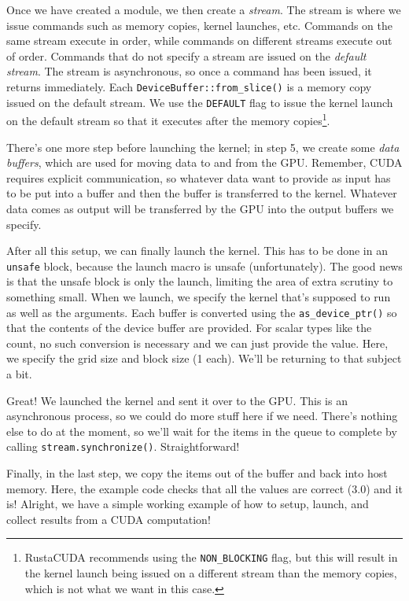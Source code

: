 Once we have created a module, we then create a \textit{stream}. The stream is where we issue commands such as memory copies, kernel launches, etc. Commands on the same stream execute in order, while commands on different streams execute out of order. Commands that do not specify a stream are issued on the \textit{default stream}. The stream is asynchronous, so once a command has been issued, it returns immediately. Each \texttt{DeviceBuffer::from\_slice()} is a memory copy issued on the default stream. We use the \texttt{DEFAULT} flag to issue the kernel launch on the default stream so that it executes after the memory copies\footnote{RustaCUDA recommends using the \texttt{NON\_BLOCKING} flag, but this will result in the kernel launch being issued on a different stream than the memory copies, which is not what we want in this case.}.

There's one more step before launching the kernel; in step 5, we
create some \emph{data buffers}, which are used for moving data to and from the GPU. Remember, CUDA requires explicit communication, so whatever data want to provide as input has to be put into a buffer and then the buffer is transferred to the kernel. Whatever data comes as output will be transferred by the GPU into the output buffers we specify.

After all this setup, we can finally launch the kernel. This has to be done in an \texttt{unsafe} block, because the launch macro is unsafe (unfortunately). The good news is that the unsafe block is only the launch, limiting the area of extra scrutiny to something small. When we launch, we specify the kernel that's supposed to run as well as the arguments. Each buffer is converted using the \texttt{as\_device\_ptr()} so that the contents of the device buffer are provided. For scalar types like the count, no such conversion is necessary and we can just provide the value. Here, we specify the grid size and block size (1 each). We'll be returning to that subject a bit.

Great! We launched the kernel and sent it over to the GPU. This is an asynchronous process, so we could do more stuff here if we need. There's nothing else to do at the moment, so we'll wait for the items in the queue to complete by calling \texttt{stream.synchronize()}. Straightforward!

Finally, in the last step, we copy the items out of the buffer and back into host memory. Here, the example code checks that all the values are correct (3.0) and it is! Alright, we have a simple working example of how to setup, launch, and collect results from a CUDA computation!


